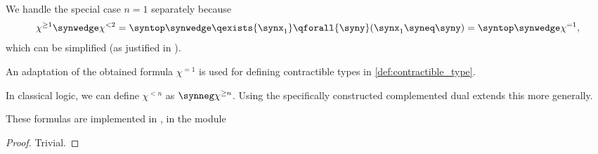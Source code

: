 \begin{comments}
  \item We handle the special case \( n = 1 \) separately because
  \begin{equation*}
    \chi^{\geq 1} \synwedge \chi^{<2} = \syntop \synwedge \qexists {\synx_1} \qforall {\syny} (\synx_1 \syneq \syny) = \syntop \synwedge \chi^{=1},
  \end{equation*}
  which can be simplified (as justified in ).

  An adaptation of the obtained formula \( \chi^{=1} \) is used for defining contractible types in \cref{def:contractible_type}.

  \item In classical logic, we can define \( \chi^{< n} \) as \( \synneg \chi^{\geq n} \). Using the specifically constructed complemented dual extends this more generally.

  \item These formulas are implemented in \cite{notebook:code}, in the module
  \begin{CodeRefDisplay}
  \end{CodeRefDisplay}
\end{comments}
\begin{proof}
  Trivial.
\end{proof}

